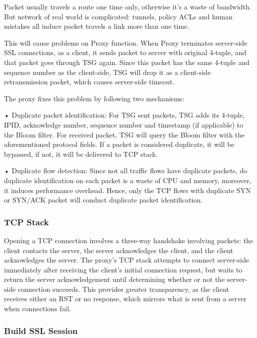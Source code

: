 Packet usually travels a route one time only, otherwise it’s a waste of bandwidth. But network of real world is complicated: tunnels, policy ACLs and human mistakes all induce packet travels a link more than one time.


This will cause problems on Proxy function. When Proxy terminates server-side SSL connections, as a client, it sends packet to server with original 4-tuple, and that packet goes through TSG again. Since this packet has the same 4-tuple and sequence number as the client-side, TSG will drop it as a client-side retransmission packet, which causes server-side timeout.


The proxy fixes this problem by following two mechanisms:


• Duplicate packet identification: For TSG sent packets, TSG adds its 4-tuple, IPID, acknowledge number, sequence number and timestamp (if applicable) to the Bloom filter. For received packet, TSG will query the Bloom filter with the aforementioned protocol fields. If a packet is considered duplicate, it will be bypassed, if not, it will be delivered to TCP stack.


• Duplicate flow detection: Since not all traffic flows have duplicate packets, do duplicate identification on each packet is a waste of CPU and memory, moreover, it induces performance overhead. Hence, only the TCP flows with duplicate SYN or SYN/ACK packet will conduct duplicate packet identification. 

\subsubsection*{\hypertarget{link:TCP Stack}{TCP Stack}}
\label{sec:appendix_e:sequence:proxy:TCP}

Opening a TCP connection involves a three-way handshake involving packets: the client contacts the server, the server acknowledges the client, and the client acknowledges the server. The proxy’s TCP stack attempts to connect server-side immediately after receiving the client's initial connection request, but waits to return the server acknowledgement until determining whether or not the server-side connection succeeds. This provides greater transparency, as the client receives either an RST or no response, which mirrors what is sent from a server when connections fail.

\subsubsection*{\hypertarget{link:Build SSL Session}{Build SSL Session}}
\label{sec:appendix_e:sequence:proxy:build}

